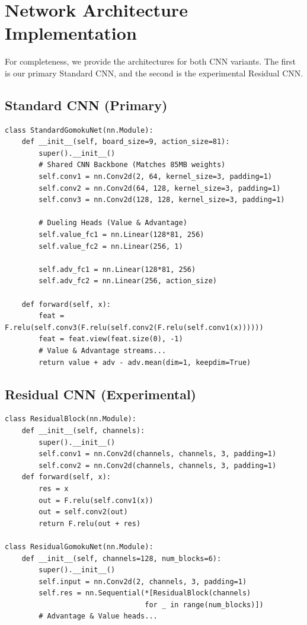 \documentclass[9pt,a4paper,twocolumn,twoside]{rho-class/rho}
\begin{document}
\section{Network Architecture Implementation}
For completeness, we provide the architectures for both CNN variants. The first is our primary Standard CNN, and the second is the experimental Residual CNN.

\subsection{Standard CNN (Primary)}
{\footnotesize
\begin{verbatim}
class StandardGomokuNet(nn.Module):
    def __init__(self, board_size=9, action_size=81):
        super().__init__()
        # Shared CNN Backbone (Matches 85MB weights)
        self.conv1 = nn.Conv2d(2, 64, kernel_size=3, padding=1)
        self.conv2 = nn.Conv2d(64, 128, kernel_size=3, padding=1)
        self.conv3 = nn.Conv2d(128, 128, kernel_size=3, padding=1)
        
        # Dueling Heads (Value & Advantage)
        self.value_fc1 = nn.Linear(128*81, 256)
        self.value_fc2 = nn.Linear(256, 1)
        
        self.adv_fc1 = nn.Linear(128*81, 256)
        self.adv_fc2 = nn.Linear(256, action_size)

    def forward(self, x):
        feat = F.relu(self.conv3(F.relu(self.conv2(F.relu(self.conv1(x))))))
        feat = feat.view(feat.size(0), -1)
        # Value & Advantage streams...
        return value + adv - adv.mean(dim=1, keepdim=True)
\end{verbatim}
}

\subsection{Residual CNN (Experimental)}
{\footnotesize
\begin{verbatim}
class ResidualBlock(nn.Module):
    def __init__(self, channels):
        super().__init__()
        self.conv1 = nn.Conv2d(channels, channels, 3, padding=1)
        self.conv2 = nn.Conv2d(channels, channels, 3, padding=1)
    def forward(self, x):
        res = x
        out = F.relu(self.conv1(x))
        out = self.conv2(out)
        return F.relu(out + res)

class ResidualGomokuNet(nn.Module):
    def __init__(self, channels=128, num_blocks=6):
        super().__init__()
        self.input = nn.Conv2d(2, channels, 3, padding=1)
        self.res = nn.Sequential(*[ResidualBlock(channels) 
                                 for _ in range(num_blocks)])
        # Advantage & Value heads...
\end{verbatim}
}
\end{document}

